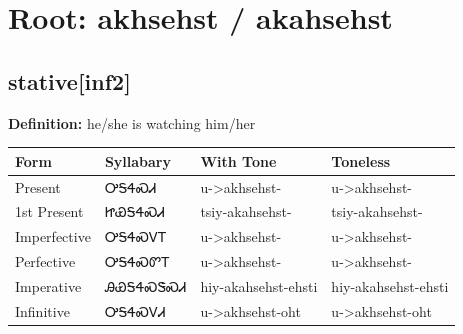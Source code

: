 \documentclass{article}%
\begin{document}
%
\normalsize%
\section*{Root: akhsehst / akahsehst}%
\subsection*{stative[inf2]}%
\textbf{Definition: }%
he/she is watching him/her%
\\[0.5em]%
\begin{tabular}{|l|l|l|l|}%
\hline%
\textbf{Form}&\textbf{Syllabary}&\textbf{With Tone}&\textbf{Toneless}\\%
\hline%
Present&ᎤᎦᏎᏍᏗ&u{-}>akhsehst{-}&u{-}>akhsehst{-}\\%
1st Present&ᏥᏯᎦᏎᏍᏗ&tsiy{-}akahsehst{-}&tsiy{-}akahsehst{-}\\%
Imperfective&ᎤᎦᏎᏍᏙᎢ&u{-}>akhsehst{-}&u{-}>akhsehst{-}\\%
Perfective&ᎤᎦᏎᏍᏛᎢ&u{-}>akhsehst{-}&u{-}>akhsehst{-}\\%
Imperative&ᎯᏯᎦᏎᏍᏕᏍᏗ&hiy{-}akahsehst{-}ehsti&hiy{-}akahsehst{-}ehsti\\%
Infinitive&ᎤᎦᏎᏍᏙᏗ&u{-}>akhsehst{-}oht&u{-}>akhsehst{-}oht\\%
\hline%
\end{tabular}%
\\[1em]%
\end{document}

